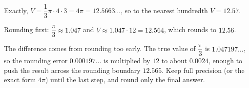 Exactly, $V=\dfrac{1}{3}\pi\cdot4\cdot3=4\pi=12.5663\ldots$, so to the nearest hundredth $V=\boxed{12.57}$.

Rounding first: $\dfrac{\pi}{3}\approx1.047$ and $V\approx1.047\cdot12=12.564$, which rounds to $12.56$.

The difference comes from rounding too early. The true value of $\dfrac{\pi}{3}$ is $1.047197\ldots$, so the rounding error $0.000197\ldots$ is multiplied by $12$ to about $0.0024$, enough to push the result across the rounding boundary $12.565$. Keep full precision (or the exact form $4\pi$) until the last step, and round only the final answer.

